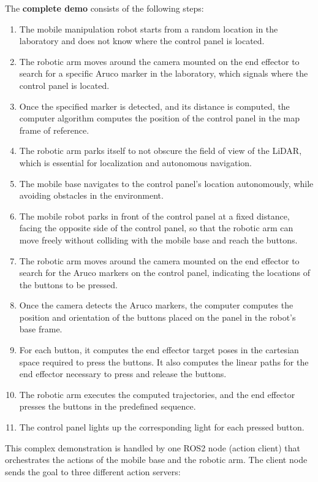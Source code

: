 The \textbf{complete demo} consists of the following steps:
\begin{enumerate}
    \item The mobile manipulation robot starts from a random location in the laboratory and does not know 
    where the control panel is located.
    \item The robotic arm moves around the camera mounted on the end effector to search for a specific Aruco marker 
    in the laboratory, which signals where the control panel is located.
    \item Once the specified marker is detected, and its distance is computed, the computer algorithm computes the
    position of the control panel in the map frame of reference.
    \item The robotic arm parks itself to not obscure the field of view of the LiDAR, which is essential for 
    localization and autonomous navigation.
    \item The mobile base navigates to the control panel's location autonomously, while avoiding obstacles in the
    environment.
    \item The mobile robot parks in front of the control panel at a fixed distance, facing the opposite side of the control panel,
    so that the robotic arm can move freely without colliding with the mobile base and reach the buttons.
    \item The robotic arm moves around the camera mounted on the end effector to search for the Aruco markers
    on the control panel, indicating the locations of the buttons to be pressed.
    \item Once the camera detects the Aruco markers, the computer computes the position and orientation
    of the buttons placed on the panel in the robot's base frame.
    \item For each button, it computes the end effector target poses in the cartesian space required to press the buttons.
    It also computes the linear paths for the end effector necessary to press and release the buttons.
    \item The robotic arm executes the computed trajectories, and the end effector presses the buttons in the predefined sequence.
    \item The control panel lights up the corresponding light for each pressed button.
\end{enumerate}

This complex demonstration is handled by one ROS2 node (action client) that orchestrates the actions of the mobile base
and the robotic arm. The client node sends the goal to three different action servers:

